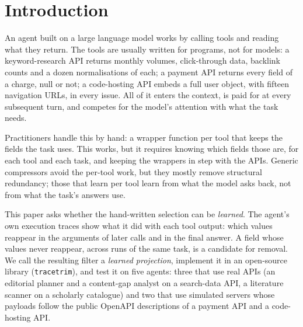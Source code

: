 \section{Introduction}
\label{sec:intro}

An agent built on a large language model works by calling tools and reading what they return. The tools are
usually written for programs, not for models: a keyword-research API returns monthly volumes, click-through data,
backlink counts and a dozen normalisations of each; a payment API returns every field of a charge, null or not; a
code-hosting API embeds a full user object, with fifteen navigation URLs, in every issue. All of it enters the
context, is paid for at every subsequent turn, and competes for the model's attention with what the task needs.

Practitioners handle this by hand: a wrapper function per tool that keeps the fields the task uses. This works,
but it requires knowing which fields those are, for each tool and each task, and keeping the wrappers in step
with the APIs. Generic compressors avoid the per-tool work, but they mostly remove structural redundancy; those that learn
per tool learn from what the model asks back, not from what the task's answers use.

This paper asks whether the hand-written selection can be \emph{learned}. The agent's own execution traces show
what it did with each tool output: which values reappear in the arguments of later calls and in the final answer.
A field whose values never reappear, across runs of the same task, is a candidate for removal. We call the
resulting filter a \emph{learned projection}, implement it in an open-source library (\texttt{tracetrim}), and
test it on five agents: three that use real APIs (an editorial planner and a content-gap analyst on a search-data
API, a literature scanner on a scholarly catalogue) and two that use simulated servers whose payloads follow the
public OpenAPI descriptions of a payment API and a code-hosting API.

